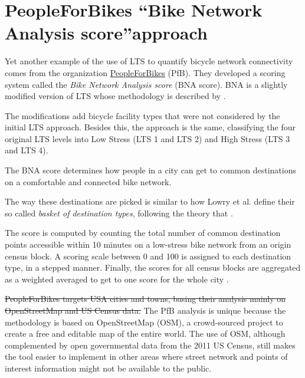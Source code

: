\documentclass[information,article,submit,moreauthors,Latex,dvi2pdf,10pt,a4paper]{Definitions/mdpi}
\begin{document}
\section{PeopleForBikes \textquotedblleft Bike Network Analysis score\textquotedblright approach} \label{pfb}

\begin{mycolorbox}[colback=yellow]
Yet another example of the use of LTS to quantify bicycle network connectivity comes from the organization \href{https://peopleforbikes.org/}{PeopleForBikes} (PfB). They developed a scoring system called the \textit{Bike Network Analysis score} (BNA score). BNA is a slightly modified version of LTS whose methodology is described by \cite{Mekuria2012b}.
\end{mycolorbox}
\begin{mycolorbox}[colback=cyan]
The modifications add bicycle facility types that were not considered by the initial LTS approach. Besides this, the approach is the same, classifying the four original LTS levels into Low Stress (LTS 1 and LTS 2) and High Stress (LTS 3 and LTS 4).
\end{mycolorbox}
The BNA score determines how people in a city can get to common destinations on a comfortable and connected bike network.
\begin{mycolorbox}[colback=yellow]
The way these destinations are picked is similar to how Lowry et al. define their so called \textit{basket of destination types}, following the theory that  \cite[p.130]{Lowry2016}.
\end{mycolorbox}
The score is computed by counting the total number of common destination points accessible within 10 minutes on a low-stress bike network from an origin census block. A scoring scale between 0 and 100 is assigned to each destination type, in a stepped manner. Finally, the scores for all census blocks are aggregated as a weighted averaged to get to one score for the whole city \cite{PeopleforBikes2014}.

\begin{mycolorbox}[colback=yellow]
\sout{PeopleForBikes targets USA cities and towns, basing their analysis mainly on OpenStreetMap and US Census data.} The PfB analysis is unique because the methodology is based on OpenStreetMap (OSM), a crowd-sourced project to create a free and editable map of the entire world. The use of OSM, although complemented by open governmental data from the 2011 US Census, still makes the tool easier to implement in other areas where street network and points of interest information might not be available to the public.
\end{mycolorbox}
\end{document}
